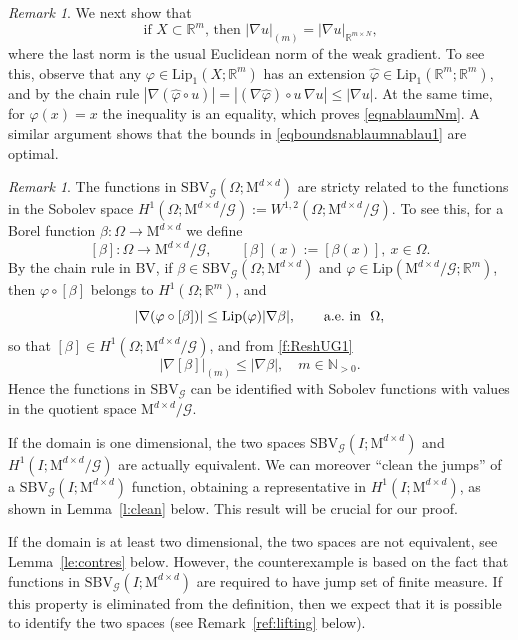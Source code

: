 \documentclass[a4paper,reqno]{amsart}
\newcommand\R{\mathbb{R}}
\newcommand\N{\mathbb{N}}
\newcommand{\BV}{\mathrm{BV}}
\newcommand{\SBVG}{\mathrm{SBV}_{\mathcal{G}}}
\newcommand{\ebeta}{{[\beta]}}
\theoremstyle{remark}
\newtheorem{remark}[definition]{Remark}
\newcommand{\G}{\mathcal{G}}
\newcommand{\Mno}{\mathrm{M}^{d\times d}}
\newcommand{\Lip}{\mathrm{Lip}}
\numberwithin{equation}{section}
\begin{document}
\begin{remark}
We next show that
\begin{equation}\label{eqnablaumNm}
\text{if $X\subset\R^m$, then $|\nabla u|_{(m)}=|\nabla u|_{\R^{m\times N}}$,}
\end{equation}
 where the last norm is the usual Euclidean norm of the weak gradient.
 To see this, observe that any $\varphi\in \Lip_1(X;\R^m)$ has an extension $\widehat\varphi\in \Lip_1(\R^m;\R^m)$, and by the chain rule
 $|\nabla (\widehat\varphi\circ u)|=|(\nabla\widehat\varphi)\circ u \, \nabla u|\le |\nabla u|$.
At the same time, for $\varphi(x)=x$ the inequality is an equality, which proves \eqref{eqnablaumNm}.
A similar argument shows that the bounds in
\eqref{eqboundsnablaumnablau1} are optimal.
\end{remark}

\begin{remark}\label{r:sbvgvsh1}
	The functions in $\SBVG(\Omega;\Mno)$ are stricty related to the functions in the Sobolev space 
	$H^1(\Omega;\Mno/\G):=W^{1,2}(\Omega;\Mno/\G)$.
To see this,
	for a Borel function $\beta\colon \Omega \to \Mno$ we define
	\[
	[\beta]\colon \Omega \to \Mno/\G, \qquad [\beta](x):=[\beta(x)], \  x\in \Omega.
	\]
By the chain rule in $\BV$, if $\beta \in \SBVG(\Omega;\Mno)$ and $\varphi\in \Lip( {\Mno}/{\G};\R^m)$, then
	$\varphi\circ \ebeta$ belongs to $H^1(\Omega;\R^m)$, and
	\begin{equation}\label{f:ReshUG1}
		|\nabla(\varphi\circ \ebeta)| \leq \Lip(\varphi)  |\nabla\beta|, \qquad  \hbox{a.e.\ in }\ \Omega,
	\end{equation}
	so that $\ebeta \in H^1(\Omega; \Mno/\G)$, and from \eqref{f:ReshUG1}
	\begin{equation}\label{f:ststgrad}
		|\nabla \ebeta|_{(m)}\leq |\nabla\beta|, \quad m\in \N_{>0}.
	\end{equation}
	Hence the functions in $\SBVG$ can be identified with Sobolev functions with values in the quotient space $\Mno/\G$.
\end{remark}

If the domain is one dimensional, the two spaces $\SBVG(I;\Mno)$ and $H^1(I;\Mno/\G)$ are actually equivalent. We can moreover ``clean the jumps'' of a $\SBVG(I;\Mno)$ function, obtaining a representative in $H^1(I;\Mno)$, as shown in Lemma~\ref{l:clean} below. This result will be crucial for our proof.

If the domain is at least two dimensional, the two spaces are not equivalent, see Lemma~\ref{le:contres} below. However, the counterexample is based on the fact that functions in $\SBVG(I;\Mno)$ are required to have jump set of finite measure. If this property is eliminated from the definition, then we expect that it is possible to identify the two spaces
(see Remark~\ref{ref:lifting} below).
\end{document}
